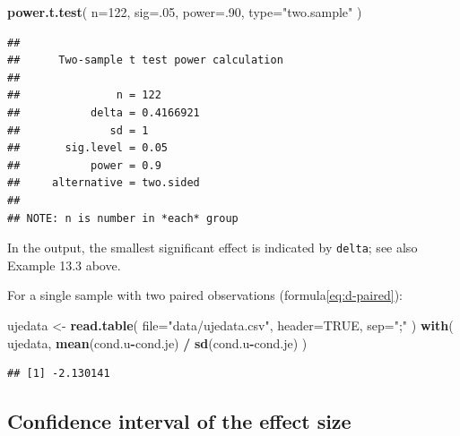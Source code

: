 \documentclass[
]{book}
\newenvironment{Shaded}{\begin{snugshade}}{\end{snugshade}}
\newcommand{\AttributeTok}[1]{\textcolor[rgb]{0.13,0.29,0.53}{#1}}
\newcommand{\ConstantTok}[1]{\textcolor[rgb]{0.56,0.35,0.01}{#1}}
\newcommand{\DecValTok}[1]{\textcolor[rgb]{0.00,0.00,0.81}{#1}}
\newcommand{\FunctionTok}[1]{\textcolor[rgb]{0.13,0.29,0.53}{\textbf{#1}}}
\newcommand{\NormalTok}[1]{#1}
\newcommand{\OtherTok}[1]{\textcolor[rgb]{0.56,0.35,0.01}{#1}}
\newcommand{\SpecialCharTok}[1]{\textcolor[rgb]{0.81,0.36,0.00}{\textbf{#1}}}
\newcommand{\StringTok}[1]{\textcolor[rgb]{0.31,0.60,0.02}{#1}}
\begin{document}
\begin{Shaded}
\begin{Highlighting}[]
\FunctionTok{power.t.test}\NormalTok{( }\AttributeTok{n=}\DecValTok{122}\NormalTok{, }\AttributeTok{sig=}\NormalTok{.}\DecValTok{05}\NormalTok{, }\AttributeTok{power=}\NormalTok{.}\DecValTok{90}\NormalTok{, }\AttributeTok{type=}\StringTok{"two.sample"}\NormalTok{ )}
\end{Highlighting}
\end{Shaded}

\begin{verbatim}
## 
##      Two-sample t test power calculation 
## 
##               n = 122
##           delta = 0.4166921
##              sd = 1
##       sig.level = 0.05
##           power = 0.9
##     alternative = two.sided
## 
## NOTE: n is number in *each* group
\end{verbatim}

In the output, the smallest significant effect is indicated by \texttt{delta}; see also
Example 13.3 above.

For a single sample with two paired observations
(formula\eqref{eq:d-paired}):

\begin{Shaded}
\begin{Highlighting}[]
\NormalTok{ujedata }\OtherTok{\textless{}{-}} \FunctionTok{read.table}\NormalTok{( }\AttributeTok{file=}\StringTok{"data/ujedata.csv"}\NormalTok{, }\AttributeTok{header=}\ConstantTok{TRUE}\NormalTok{, }\AttributeTok{sep=}\StringTok{";"}\NormalTok{ )}
\FunctionTok{with}\NormalTok{( ujedata, }\FunctionTok{mean}\NormalTok{(cond.u}\SpecialCharTok{{-}}\NormalTok{cond.je) }\SpecialCharTok{/} \FunctionTok{sd}\NormalTok{(cond.u}\SpecialCharTok{{-}}\NormalTok{cond.je) )}
\end{Highlighting}
\end{Shaded}

\begin{verbatim}
## [1] -2.130141
\end{verbatim}

\subsection{Confidence interval of the effect size}\label{sec:confint-effectsize}
\end{document}
